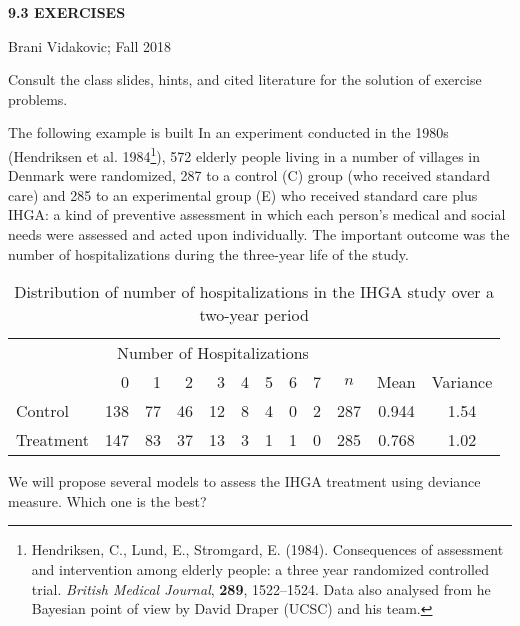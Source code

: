 \documentclass[12pt]{article}
\begin{document}
\thispagestyle{empty}
\vspace*{ 0.1in}

\begin{center}
        { \Large \bf   9.3 EXERCISES}
\end{center}

\noindent  Brani  Vidakovic;  Fall 2018


\noindent Consult the class slides, hints, and  cited literature for
the solution of exercise problems.

\vspace{0.5in}

 The following example is built 
 In an experiment conducted in the 1980s (Hendriksen et al. 1984\footnote
 {Hendriksen, C., Lund, E., Stromgard, E. (1984). Consequences of 
 assessment and intervention
among elderly people: a three year randomized controlled trial. 
{\it British Medical Journal},
{\bf 289}, 1522--1524. Data also analysed from he Bayesian point of view by David Draper (UCSC) and his team.}), 
 572 elderly people living in a number of villages in Denmark 
 were randomized, 287 to a control (C) group (who received standard care) 
 and 285 to an experimental group (E) who received standard 
 care plus IHGA: a kind of preventive assessment in which 
 each person's medical and social needs were assessed and acted upon individually. The important outcome was the number 
 of hospitalizations during the three-year life of the study.
 
  
  \begin{table}[h]
  \centering
  \caption{Distribution of number of hospitalizations in the IHGA study over a two-year period}
  \begin{tabular}{|l|rrrrrrrr|ccc|}
  \hline
             &\multicolumn{8}{|c|}{Number of Hospitalizations} &  &  &  \\
      &0 &1 &2 &3 &4 &5 &6 &7 & $n$ & Mean & Variance\\ \hline
Control &138 &77 &46 &12 &8 &4 &0 &2 &287 &0.944 &1.54\\
Treatment &147 &83 &37 &13 & 3 &1 &1 &0 &285 &0.768 &1.02\\
\hline
\end{tabular}
\end{table}

 We will propose several models to assess the IHGA treatment
 using deviance measure. Which one is the best?
 
\end{document}

